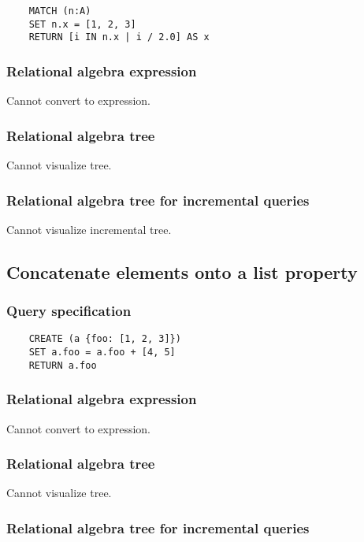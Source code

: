 	\begin{lstlisting}
	MATCH (n:A)
	SET n.x = [1, 2, 3]
	RETURN [i IN n.x | i / 2.0] AS x
	\end{lstlisting}


	\subsubsection*{Relational algebra expression}

	Cannot convert to expression.

	\subsubsection*{Relational algebra tree}

	Cannot visualize tree.

	\subsubsection*{Relational algebra tree for incremental queries}

	Cannot visualize incremental tree.
	\subsection{Concatenate elements onto a list property}

	\subsubsection*{Query specification}

	\begin{lstlisting}
	CREATE (a {foo: [1, 2, 3]})
	SET a.foo = a.foo + [4, 5]
	RETURN a.foo
	\end{lstlisting}


	\subsubsection*{Relational algebra expression}

	Cannot convert to expression.

	\subsubsection*{Relational algebra tree}

	Cannot visualize tree.

	\subsubsection*{Relational algebra tree for incremental queries}

